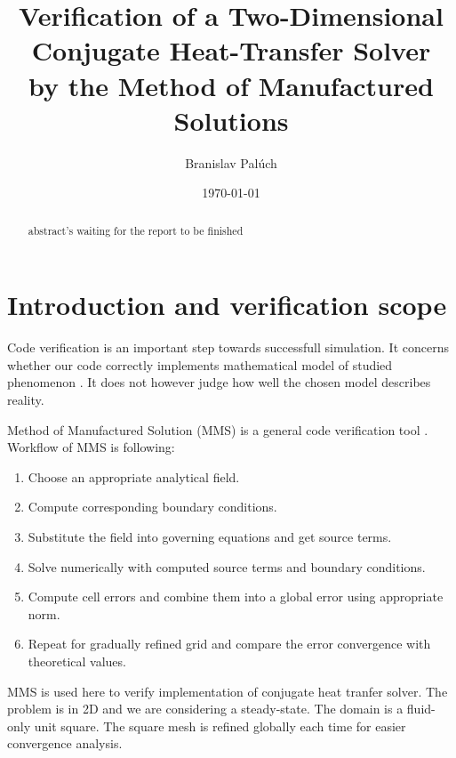 \documentclass[11pt,a4paper]{article}
\title{Verification of a Two-Dimensional Conjugate Heat-Transfer Solver\\
       by the Method of Manufactured Solutions}
\author{Branislav Palúch}
\date{\today}
\begin{document}
\maketitle

\begin{abstract}
abstract's waiting for the report to be finished
\end{abstract}

\section{Introduction and verification scope}
Code verification is an important step towards successfull simulation.
It concerns whether our code correctly implements mathematical model of studied phenomenon \cite{roy2005verification}.
It does not however judge how well the chosen model describes reality.

Method of Manufactured Solution (MMS) is a general code verification tool \cite{salari2000mms}.
Workflow of MMS is following:
\begin{enumerate}
  \item Choose an appropriate analytical field.
  \item Compute corresponding boundary conditions.
  \item Substitute the field into governing equations and get source terms.
  \item Solve numerically with computed source terms and boundary conditions.
  \item Compute cell errors and combine them into a global error using appropriate norm.
  \item Repeat for gradually refined grid and compare the error convergence with theoretical values.
\end{enumerate}


MMS is used here to verify implementation of conjugate heat tranfer solver.
The problem is in 2D and we are considering a steady-state.
The domain is a fluid-only unit square.
The square mesh is refined globally each time for easier convergence analysis.
\end{document}
